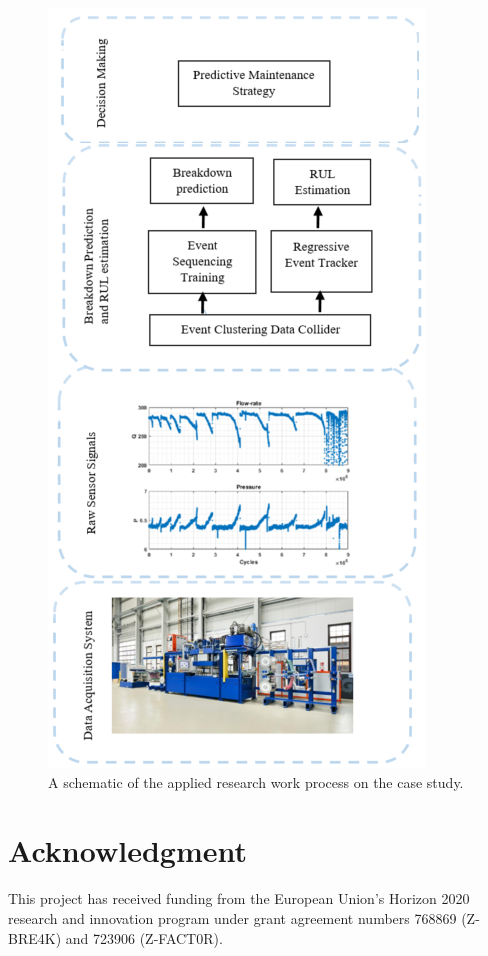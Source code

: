 \documentclass[conference]{IEEEtran}
\begin{document}
\begin{figure}[htbp]
\centerline{\includegraphics[width=0.95\linewidth]{Schematic_applied_work.png}}
\caption{A schematic of the applied research work process on the case study.}
\label{fig:Schematic_applied_work}
\end{figure}

\section*{Acknowledgment}
\label{sec:Acknowledgment}
This project has received funding from the European Union's Horizon 2020 research and innovation program under grant agreement numbers 768869 (Z-BRE4K) and 723906 (Z-FACT0R).

\vfill



\end{document}
